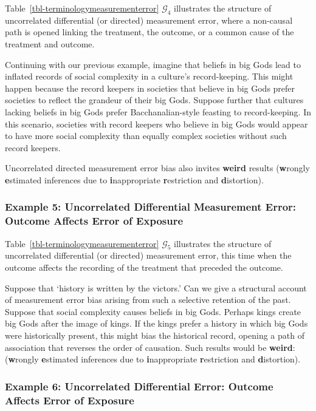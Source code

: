 \documentclass[
  single column]{article}
\begin{document}
Table~\ref{tbl-terminologymeasurementerror} \(\mathcal{G}_4\)
illustrates the structure of uncorrelated differential (or directed)
measurement error, where a non-causal path is opened linking the
treatment, the outcome, or a common cause of the treatment and outcome.

Continuing with our previous example, imagine that beliefs in big Gods
lead to inflated records of social complexity in a culture's
record-keeping. This might happen because the record keepers in
societies that believe in big Gods prefer societies to reflect the
grandeur of their big Gods. Suppose further that cultures lacking
beliefs in big Gods prefer Bacchanalian-style feasting to
record-keeping. In this scenario, societies with record keepers who
believe in big Gods would appear to have more social complexity than
equally complex societies without such record keepers.

Uncorrelated directed measurement error bias also invites \textbf{weird}
results (\textbf{w}rongly \textbf{e}stimated inferences due to
\textbf{i}nappropriate \textbf{r}estriction and \textbf{d}istortion).

\subsubsection{Example 5: Uncorrelated Differential Measurement Error:
Outcome Affects Error of
Exposure}\label{example-5-uncorrelated-differential-measurement-error-outcome-affects-error-of-exposure}

Table~\ref{tbl-terminologymeasurementerror} \(\mathcal{G}_5\)
illustrates the structure of uncorrelated differential (or directed)
measurement error, this time when the outcome affects the recording of
the treatment that preceded the outcome.

Suppose that `history is written by the victors.' Can we give a
structural account of measurement error bias arising from such a
selective retention of the past. Suppose that social complexity causes
beliefs in big Gods. Perhaps kings create big Gods after the image of
kings. If the kings prefer a history in which big Gods were historically
present, this might bias the historical record, opening a path of
association that reverses the order of causation. Such results would be
\textbf{weird}: (\textbf{w}rongly \textbf{e}stimated inferences due to
\textbf{i}nappropriate \textbf{r}estriction and \textbf{d}istortion).

\subsubsection{Example 6: Uncorrelated Differential Error: Outcome
Affects Error of
Exposure}\label{example-6-uncorrelated-differential-error-outcome-affects-error-of-exposure}
\end{document}

